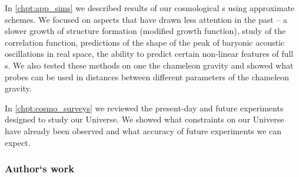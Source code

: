 In \autoref{chpt:app_sims} we described results of our cosmological \nbodysim s using approximate schemes. We focused on aspects that have drawn less attention in the past -- a slower growth of structure formation (modified growth function), study of the correlation function, predictions of the shape of the peak of baryonic acoustic oscillations in real space, the ability to predict certain non-linear features of full \nbody s. We also tested these methods on one the chameleon gravity and showed what probes can be used in distances between different parameters of the chameleon gravity.

In \autoref{chpt:cosmo_surveys} we reviewed the present-day and future experiments designed to study our Universe. We showed what constraints on our Universe have already been observed and what accuracy of future experiments we can expect.

\subsubsection{Author`s work}
